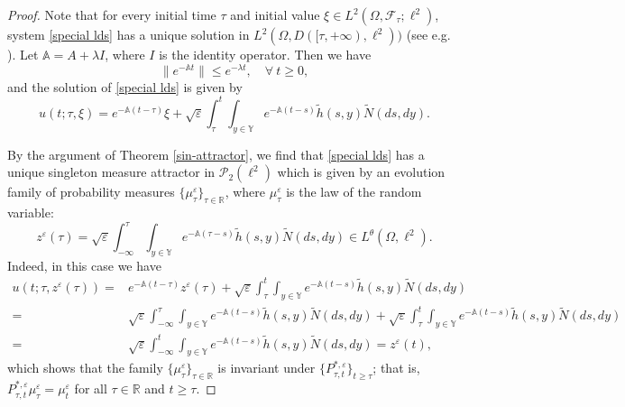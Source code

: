 \documentclass[11pt]{article}
\numberwithin{equation}{section}
\theoremstyle{plain}
\begin{document}
\begin{proof}
  Note that
  for every initial time $\tau$ and initial value $\xi \in L^2(\Omega, \mathcal{F}_\tau; \ell^2)$,
  system \eqref{special lds}
  has a unique solution
   in $L^2(\Omega, D([\tau, +\infty), \ell^2) )$
   (see e.g. \cite{W2011CSA}).
  Let $\mathbb{A} = A + \lambda I$, where $I$ is the identity operator.
  Then we have
 $$
   \| e^{-\mathbb{A}t} \| \le e^{- \lambda t},  \quad \forall \ t \ge 0,
 $$
and the  solution
of \eqref{special lds} is given by 
 $$ u(t; \tau, \xi)
   = e^{- \mathbb{A}(t - \tau)} \xi
     + \sqrt{\varepsilon} 
              \int_\tau^t 
                  \int_{y \in \mathbb{Y} } 
                           e^{- \mathbb{A}(t-s)} 
                           \widetilde{h}(s, y) \widetilde{N}(ds,dy).
 $$

By the argument of 
  Theorem \ref{sin-attractor},
 we find that \eqref{special lds} has a unique singleton measure attractor in $\mathcal{P}_2(\ell^2)$
 which is  given by an evolution family of 
 probability measures $\{\mu_\tau^\varepsilon\}_{\tau \in \mathbb{R}}$,
 where $\mu_\tau^\varepsilon$
 is the   law  of the random variable:
 $$
 z^\varepsilon(\tau) 
     = \sqrt{\varepsilon} 
             \int_{-\infty}^\tau 
                 \int_{y \in \mathbb{Y}} 
                       e^{- \mathbb{A}(\tau - s)}  \widetilde{h}(s, y) 
             \widetilde{N}(ds,dy) 
     \in L^\theta(\Omega, \ell^2).
     $$
 Indeed, in this case   we have
 \begin{align*}
      u(t; \tau, z^\varepsilon(\tau) )
   = & e^{-\mathbb{A}(t - \tau)} z^\varepsilon(\tau)
         + \sqrt{\varepsilon} 
                 \int_\tau^t 
                     \int_{y \in \mathbb{Y} } 
                              e^{- \mathbb{A}(t - s)} 
                                    \widetilde{h}(s, y) 
                                         \widetilde{N}(ds,dy)  \nonumber\\
   = & \sqrt{\varepsilon} 
                 \int_{-\infty}^\tau 
                      \int_{y \in \mathbb{Y} } 
                                e^{- \mathbb{A}(t - s)} 
                                      \widetilde{h}(s, y) 
                                           \widetilde{N}(ds,dy)
        + \sqrt{\varepsilon} 
                  \int_\tau^t 
                       \int_{y \in \mathbb{Y} } 
                                e^{- \mathbb{A}(t - s)} 
                                      \widetilde{h}(s, y) 
                                           \widetilde{N}(ds,dy)  \nonumber\\
  = & \sqrt{\varepsilon}
               \int_{-\infty}^t 
                    \int_{y \in \mathbb{Y} } 
                         e^{- \mathbb{A}(t - s)}
                               \widetilde{h}(s, y) 
                                     \widetilde{N}(ds,dy)  
  =  z^\varepsilon(t),
 \end{align*}
 which shows that
 the family
  $\{\mu_\tau^\varepsilon\}_{\tau \in \mathbb{R}}$
  is invariant under  $\{P^{*,\varepsilon}_{\tau, t}\}_{t\ge \tau}$;
  that is,
  $P^{*,\varepsilon}_{\tau, t} \mu_\tau^\varepsilon = \mu_t^\varepsilon$
  for all $\tau \in\mathbb{R}$
  and $t\ge \tau$.
   

\end{proof}
\end{document}
